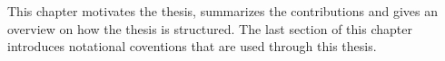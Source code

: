 This chapter motivates the thesis, summarizes the contributions and
gives an overview on how the thesis is structured. The last section of
this chapter introduces notational coventions that are used through
this thesis.

